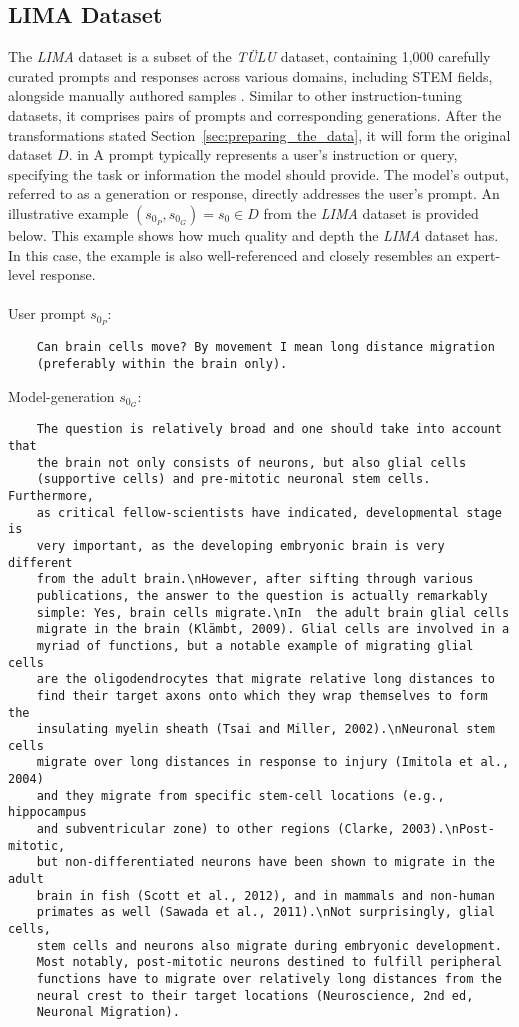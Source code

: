 \subsection{LIMA Dataset}\label{subsec:lima_dataset}
The \emph{LIMA} dataset is a subset of the \emph{TÜLU} dataset, containing 1,000 carefully curated prompts and responses across various domains, including STEM fields, alongside manually authored samples \cite{zhou2023limaalignment}. Similar to other instruction-tuning datasets, it comprises pairs of prompts and corresponding generations. After the transformations stated Section~\ref{sec:preparing_the_data}, it will form the original dataset $D$. in A prompt typically represents a user's instruction or query, specifying the task or information the model should provide. The model's output, referred to as a generation or response, directly addresses the user's prompt. An illustrative example $(s_{0_P},s_{0_G})=s_0 \in D$ from the \emph{LIMA} dataset is provided below. This example shows how much quality and depth the \emph{LIMA} dataset has. In this case, the example is also well-referenced and closely resembles an expert-level response.
\\\\
User prompt $s_{0_P}$:
\begin{verbatim}
    Can brain cells move? By movement I mean long distance migration 
    (preferably within the brain only).
\end{verbatim}
Model-generation $s_{0_G}$:
\begin{verbatim}
    The question is relatively broad and one should take into account that 
    the brain not only consists of neurons, but also glial cells 
    (supportive cells) and pre-mitotic neuronal stem cells. Furthermore,
    as critical fellow-scientists have indicated, developmental stage is
    very important, as the developing embryonic brain is very different 
    from the adult brain.\nHowever, after sifting through various 
    publications, the answer to the question is actually remarkably 
    simple: Yes, brain cells migrate.\nIn  the adult brain glial cells
    migrate in the brain (Klämbt, 2009). Glial cells are involved in a
    myriad of functions, but a notable example of migrating glial cells
    are the oligodendrocytes that migrate relative long distances to 
    find their target axons onto which they wrap themselves to form the
    insulating myelin sheath (Tsai and Miller, 2002).\nNeuronal stem cells
    migrate over long distances in response to injury (Imitola et al., 2004)
    and they migrate from specific stem-cell locations (e.g., hippocampus 
    and subventricular zone) to other regions (Clarke, 2003).\nPost-mitotic,
    but non-differentiated neurons have been shown to migrate in the adult 
    brain in fish (Scott et al., 2012), and in mammals and non-human 
    primates as well (Sawada et al., 2011).\nNot surprisingly, glial cells, 
    stem cells and neurons also migrate during embryonic development. 
    Most notably, post-mitotic neurons destined to fulfill peripheral 
    functions have to migrate over relatively long distances from the 
    neural crest to their target locations (Neuroscience, 2nd ed, 
    Neuronal Migration).
\end{verbatim}

